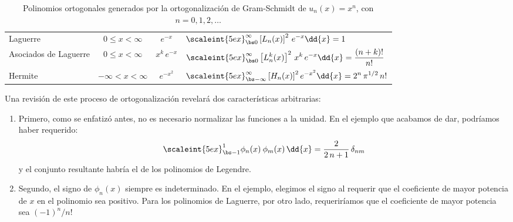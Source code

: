 \begin{landscape}
\begin{table}[H]
{\begin{tabular}{p{5cm} c c p{10cm}}
Laguerre & $0 \leq x < \infty $ & $e^{-x}$ & $\displaystyle \scaleint{5ex}_{\bs 0}^{\infty} \left[ L_{n} (x) \right]^{2} \, e^{-x} \dd{x} =  1 $ \\
Asociados de Laguerre & $0 \leq x < \infty $ & $x^{k} \, e^{-x}$ & $\displaystyle \scaleint{5ex}_{\bs 0}^{\infty} \left[ L_{n}^{k} (x) \right]^{2} \, x^{k} \, e^{-x} \dd{x} = \dfrac{(n + k)!}{n!} $ \\
Hermite & $- \infty < x < \infty $ & $e^{-x^{2}}$ & $\displaystyle \scaleint{5ex}_{\bs -\infty}^{\infty} \left[ H_{n} (x) \right]^{2} e^{-x^{2}} \dd{x} = 2^{n} \, \pi^{1/2} \, n! $
\end{tabular}}
\caption{Polinomios ortogonales generados por la ortogonalización de Gram-Schmidt de $u_{n} (x)= x^{n}$, con $n=0,1,2,\ldots$}
\label{tabla:tabla_03}
\end{table}
\end{landscape}
Una revisión de este proceso de ortogonalización revelará dos características arbitrarias:
\begin{enumerate}
\item Primero, como se enfatizó antes, no es necesario normalizar las funciones a la unidad. En el ejemplo que acabamos de dar, podríamos haber requerido:
\begin{align}
\scaleint{5ex}_{\bs -1}^{1} \phi_{n} (x) \: \phi_{m} (x) \, \dd{x} = \dfrac{2}{2 \, n +1} \, \delta_{nm}
\label{eq:ecuacion_10_61}
\end{align}
y el conjunto resultante habría el de los polinomios de Legendre.
\item Segundo, el signo de $\phi_{n} (x)$ siempre es indeterminado. En el ejemplo, elegimos el signo al requerir que el coeficiente de mayor potencia de $x$ en el polinomio sea positivo. Para los polinomios de Laguerre, por otro lado, requeriríamos que el coeficiente de mayor potencia sea $(-1)^{n}/n!$
\end{enumerate}

